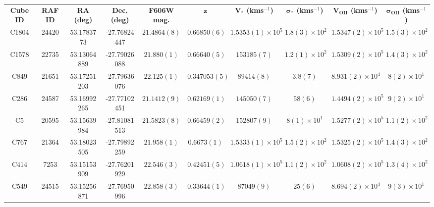 \documentclass[12pt, twocolumn]{revtex4-1}    %
\begin{document}
\begin{table}
\vspace{50ex}
\centering
\begin{tabular}{c@{\hskip 10pt}c@{\hskip 10pt}c@{\hskip 10pt}c@{\hskip 10pt}c@{\hskip 10pt}c@{\hskip 10pt}c@{\hskip 10pt}c@{\hskip 10pt}c@{\hskip 10pt}c} 
 \hline
 \textbf{Cube ID} & \textbf{RAF ID} & \textbf{RA (deg)} & \textbf{Dec. (deg)} & \textbf{F606W mag.} & \textbf{$\boldsymbol{z}$} & \textbf{$\boldsymbol{V_*}$ (kms$^{-1}$)} & \textbf{$\boldsymbol{\sigma_*}$ (kms$^{-1}$)} & \textbf{$\boldsymbol{V_{OII}}$ (kms$^{-1}$)} & \textbf{$\boldsymbol{\sigma_{OII}}$ (kms$^{-1}$)} \\ [0.5ex] 
C1804 & 24420 & 53.1783773 & -27.76824447 & $21.4864(8)$ & $0.66850(6)$ & $1.5353(1) \times 10^{5}$ & $1.8(3) \times 10^{2}$ & $1.5347(2) \times 10^{5}$ & $ 1.5(3) \times 10^{2}$ \\ 

C1578 & 22735 & 53.13064889 & -27.79026088 & $21.880(1)$ & $0.66640(5)$ & $153185(7)$ & $1.2(1) \times 10^{2}$ & $1.5309(2) \times 10^{5}$ & $ 1.4(3) \times 10^{2}$ \\ 

C849 & 21651 & 53.17251203 & -27.79636076 & $22.125(1)$ & $0.347053(5)$ & $89414(8)$ & $3.8(7)$ & $8.931(2) \times 10^{4}$ & $ 8(2) \times 10^{1}$ \\ 

C286 & 24587 & 53.16992265 & -27.77102451 & $21.1412(9)$ & $0.62169(1)$ & $145050(7)$ & $58(6)$ & $1.4494(2) \times 10^{5}$ & $ 9(2) \times 10^{1}$ \\ 

C5 & 20595 & 53.15639984 & -27.81081513 & $21.5823(8)$ & $0.66459(2)$ & $152807(9)$ & $8(1) \times 10^{1}$ & $1.5277(2) \times 10^{5}$ & $ 1.1(2) \times 10^{2}$ \\ 

C767 & 21364 & 53.18023505 & -27.79892259 & $21.958(1)$ & $0.6673(1)$ & $1.5333(1) \times 10^{5}$ & $1.5(2) \times 10^{2}$ & $1.5325(2) \times 10^{5}$ & $ 1.4(3) \times 10^{2}$ \\ 

C414 & 7253 & 53.15153909 & -27.76201929 & $22.546(3)$ & $0.42451(5)$ & $1.0618(1) \times 10^{5}$ & $1.1(2) \times 10^{2}$ & $1.0608(2) \times 10^{5}$ & $ 1.3(4) \times 10^{2}$ \\ 

C549 & 24515 & 53.15256871 & -27.76950996 & $22.858(3)$ & $0.33644(1)$ & $87049(9)$ & $25(6)$ & $8.694(2) \times 10^{4}$ & $ 9(3) \times 10^{1}$ \\ 


\end{tabular}
\end{table}
\end{document}
